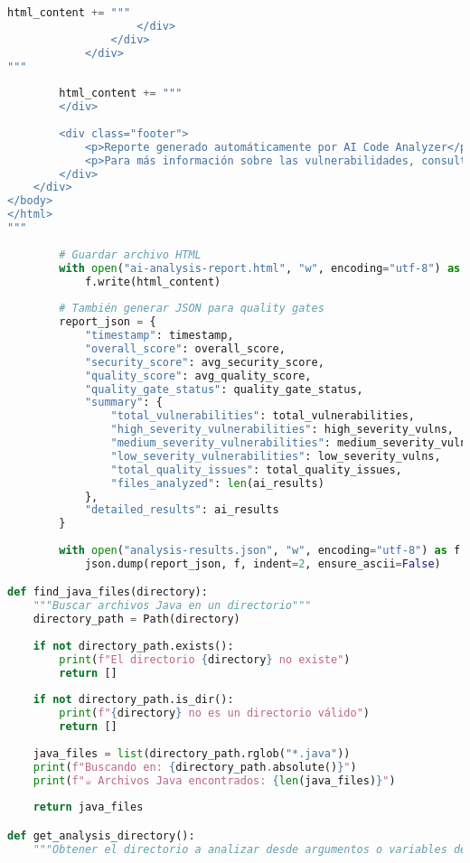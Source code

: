 \begin{lstlisting}[language=python, caption={Contenido completo del script ai\_analyzer.py.}, label={lst:python_script}]
                html_content += """
                    </div>
                </div>
            </div>
"""
        
        html_content += """
        </div>
        
        <div class="footer">
            <p>Reporte generado automáticamente por AI Code Analyzer</p>
            <p>Para más información sobre las vulnerabilidades, consulta OWASP Top 10 y CWE</p>
        </div>
    </div>
</body>
</html>
"""
        
        # Guardar archivo HTML
        with open("ai-analysis-report.html", "w", encoding="utf-8") as f:
            f.write(html_content)
        
        # También generar JSON para quality gates
        report_json = {
            "timestamp": timestamp,
            "overall_score": overall_score,
            "security_score": avg_security_score,
            "quality_score": avg_quality_score,
            "quality_gate_status": quality_gate_status,
            "summary": {
                "total_vulnerabilities": total_vulnerabilities,
                "high_severity_vulnerabilities": high_severity_vulns,
                "medium_severity_vulnerabilities": medium_severity_vulns,
                "low_severity_vulnerabilities": low_severity_vulns,
                "total_quality_issues": total_quality_issues,
                "files_analyzed": len(ai_results)
            },
            "detailed_results": ai_results
        }
        
        with open("analysis-results.json", "w", encoding="utf-8") as f:
            json.dump(report_json, f, indent=2, ensure_ascii=False)

def find_java_files(directory):
    """Buscar archivos Java en un directorio"""
    directory_path = Path(directory)
    
    if not directory_path.exists():
        print(f"El directorio {directory} no existe")
        return []
    
    if not directory_path.is_dir():
        print(f"{directory} no es un directorio válido")
        return []
    
    java_files = list(directory_path.rglob("*.java"))
    print(f"Buscando en: {directory_path.absolute()}")
    print(f"☕ Archivos Java encontrados: {len(java_files)}")
    
    return java_files

def get_analysis_directory():
    """Obtener el directorio a analizar desde argumentos o variables de entorno"""
    

\end{lstlisting}
